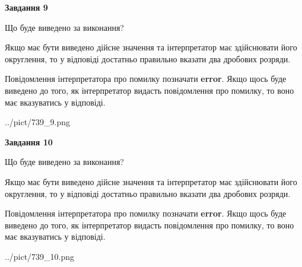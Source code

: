 \documentclass[12pt, ukrainian]{article}
\begin{document}
{\begin {Large}
{\begin {center}\textbf{Завдання 9}\end {center}}\par
Що буде виведено за виконання? \par

Якщо має бути виведено дійсне значення та інтерпретатор має здійснювати його округлення, 
то у відповіді достатньо правильно вказати два дробових розряди.

Повідомлення інтерпретатора про помилку позначати \textbf{error}.
Якщо щось буде виведено до того, як інтерпретатор видасть повідомлення про помилку, 
то воно має вказуватись у відповіді. \par

\begin{center}
	{../pict/739_9.png}
\end{center}
\newpage

{\begin {center}\textbf{Завдання 10}\end {center}}\par
Що буде виведено за виконання? \par

Якщо має бути виведено дійсне значення та інтерпретатор має здійснювати його округлення, 
то у відповіді достатньо правильно вказати два дробових розряди.

Повідомлення інтерпретатора про помилку позначати \textbf{error}.
Якщо щось буде виведено до того, як інтерпретатор видасть повідомлення про помилку, 
то воно має вказуватись у відповіді. \par

\begin{center}
	{../pict/739_10.png}
\end{center}
\newpage

\end {Large}}
\end{document}
